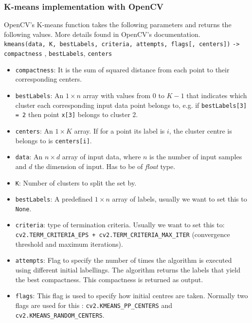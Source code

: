 \documentclass[a4paper]{article}
\begin{document}
\subsubsection{K-means implementation with OpenCV}

OpenCV's K-means function takes the following parameters and returns the following values. More details found in OpenCV's documentation.\\
\texttt{kmeans(data, K, bestLabels, criteria, attempts, flags[, centers])} \texttt{-> compactness} , \texttt{bestLabels}, \texttt{centers}
\begin{itemize}
    \item \texttt{compactness}: It is the sum of squared distance from each point to their corresponding centers.
    \item \texttt{bestLabels}: An $1\times n$ array with values from $0$ to $K-1$ that indicates which cluster each corresponding input data point belongs to, e.g. if \texttt{bestLabels[3] = 2} then point \texttt{x[3]} belongs to cluster 2.
    
    \item \texttt{centers}: An $1\times K$ array. If for a point its label is $i$, the cluster centre is belongs to is \texttt{centers[i]}.

    \item \texttt{data}: An $n \times d$ array of input data, where $n$ is the number of input samples and $d$ the dimension of input. Has to be of \textit{float} type.
    
    \item \texttt{K}: Number of clusters to split the set by.
    \item \texttt{bestLabels}: A predefined $1\times n$ array of labels, usually we want to set this to \texttt{None}. 
    \item \texttt{criteria}: type of termination criteria. Usually we want to set this to:\\
    \texttt{cv2.TERM_CRITERIA_EPS + cv2.TERM_CRITERIA_MAX_ITER} (convergence threshold and maximum iterations).
    \item \texttt{attempts}: Flag to specify the number of times the algorithm is executed using different initial labellings. The algorithm returns the labels that yield the best compactness. This compactness is returned as output.    
    \item \texttt{flags}: This flag is used to specify how initial centres are taken. Normally two flags are used for this : \texttt{cv2.KMEANS_PP_CENTERS} and \texttt{cv2.KMEANS_RANDOM_CENTERS}.
\end{itemize}
\end{document}

